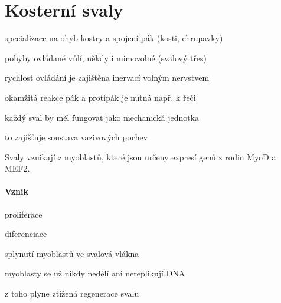 \documentclass[DIV=8]{scrreprt}
\begin{document}

\section{Kosterní svaly} \label{Kosterní svaly} \FloatBarrier


\begin{myItemize}[nosep]
    \item specializace na ohyb kostry a spojení pák (kosti, chrupavky)
    \item pohyby ovládané vůlí, někdy i mimovolné (svalový třes)
    \item rychlost ovládání je zajištěna inervací volným nervstvem
\begin{myItemize}[nosep]
    \item okamžitá reakce pák a protipák je nutná např. k řeči
\end{myItemize}

    \item každý sval by měl fungovat jako mechanická jednotka
\begin{myItemize}[nosep]
    \item to zajišťuje soustava vazivových pochev
\end{myItemize}

\end{myItemize}



Svaly vznikají z myoblastů, které jsou určeny expresí genů z rodin MyoD a MEF2.

\paragraph{Vznik}
\begin{myEnumerate}[nosep]
    \item proliferace
    \item diferenciace
    \item splynutí myoblastů ve svalová vlákna
\begin{myItemize}[nosep]
    \item myoblasty se už nikdy nedělí ani nereplikují DNA
    \item z toho plyne ztížená regenerace svalu
\end{myItemize}

\end{myEnumerate}
\end{document}
